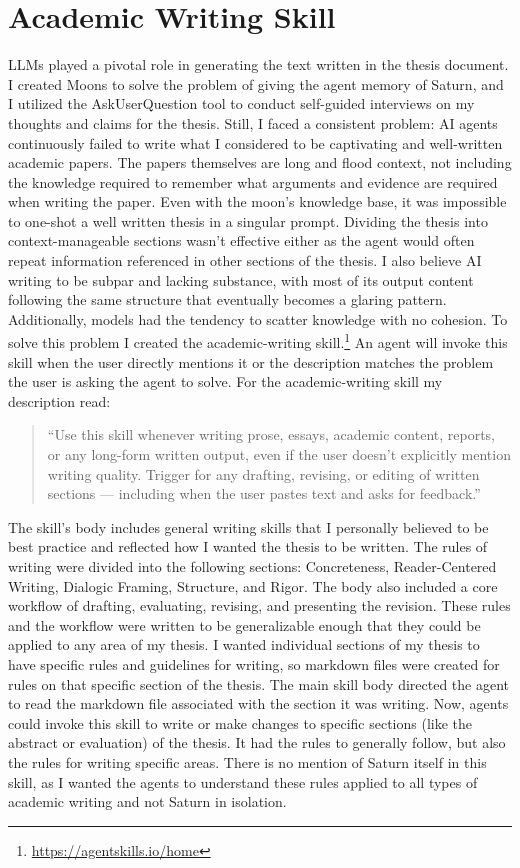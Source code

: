 \section{Academic Writing Skill}

LLMs played a pivotal role in generating the text written in the thesis document. I created Moons to solve the problem of giving the agent memory of Saturn, and I utilized the AskUserQuestion tool to conduct self-guided interviews on my thoughts and claims for the thesis. Still, I faced a consistent problem: AI agents continuously failed to write what I considered to be captivating and well-written academic papers. The papers themselves are long and flood context, not including the knowledge required to remember what arguments and evidence are required when writing the paper. Even with the moon's knowledge base, it was impossible to one-shot a well written thesis in a singular prompt. Dividing the thesis into context-manageable sections wasn't effective either as the agent would often repeat information referenced in other sections of the thesis. I also believe AI writing to be subpar and lacking substance, with most of its output content following the same structure that eventually becomes a glaring pattern. Additionally, models had the tendency to scatter knowledge with no cohesion. To solve this problem I created the academic-writing skill.\footnote{\url{https://agentskills.io/home}} An agent will invoke this skill when the user directly mentions it or the description matches the problem the user is asking the agent to solve. For the academic-writing skill my description read:

\begin{quote}
``Use this skill whenever writing prose, essays, academic content, reports, or any long-form written output, even if the user doesn't explicitly mention writing quality. Trigger for any drafting, revising, or editing of written sections --- including when the user pastes text and asks for feedback.''
\end{quote}

The skill's body includes general writing skills that I personally believed to be best practice and reflected how I wanted the thesis to be written. The rules of writing were divided into the following sections: Concreteness, Reader-Centered Writing, Dialogic Framing, Structure, and Rigor. The body also included a core workflow of drafting, evaluating, revising, and presenting the revision. These rules and the workflow were written to be generalizable enough that they could be applied to any area of my thesis. I wanted individual sections of my thesis to have specific rules and guidelines for writing, so markdown files were created for rules on that specific section of the thesis. The main skill body directed the agent to read the markdown file associated with the section it was writing. Now, agents could invoke this skill to write or make changes to specific sections (like the abstract or evaluation) of the thesis. It had the rules to generally follow, but also the rules for writing specific areas. There is no mention of Saturn itself in this skill, as I wanted the agents to understand these rules applied to all types of academic writing and not Saturn in isolation.

